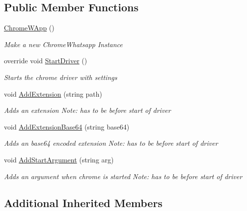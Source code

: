 \subsection*{Public Member Functions}
\begin{DoxyCompactItemize}
\item 
\hyperlink{class_web_whatsapp_a_p_i_1_1_chrome_1_1_chrome_w_app_a9c8ebf61ff410da72e8a50d68cbcf0f5}{Chrome\+W\+App} ()
\begin{DoxyCompactList}\small\item\em Make a new Chrome\+Whatsapp Instance \end{DoxyCompactList}\item 
override void \hyperlink{class_web_whatsapp_a_p_i_1_1_chrome_1_1_chrome_w_app_a2ed5da636b9baf0766bd6804739a9bfb}{Start\+Driver} ()
\begin{DoxyCompactList}\small\item\em Starts the chrome driver with settings \end{DoxyCompactList}\item 
void \hyperlink{class_web_whatsapp_a_p_i_1_1_chrome_1_1_chrome_w_app_aaf4df519b4cda569bbb8f6d757a372f2}{Add\+Extension} (string path)
\begin{DoxyCompactList}\small\item\em Adds an extension Note\+: has to be before start of driver \end{DoxyCompactList}\item 
void \hyperlink{class_web_whatsapp_a_p_i_1_1_chrome_1_1_chrome_w_app_a6a01da1da6329da843cbed002716ea36}{Add\+Extension\+Base64} (string base64)
\begin{DoxyCompactList}\small\item\em Adds an base64 encoded extension Note\+: has to be before start of driver \end{DoxyCompactList}\item 
void \hyperlink{class_web_whatsapp_a_p_i_1_1_chrome_1_1_chrome_w_app_a4dd7c9e90b65a5c3fdbb7d0b12f4823c}{Add\+Start\+Argument} (string arg)
\begin{DoxyCompactList}\small\item\em Adds an argument when chrome is started Note\+: has to be before start of driver \end{DoxyCompactList}\end{DoxyCompactItemize}
\subsection*{Additional Inherited Members}


